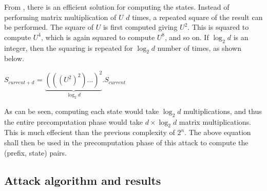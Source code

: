 From \cite{erik-discussions}, there is an efficient solution for computing the states. Instead of performing matrix multiplication of $U$ $d$ times, a repeated square of the result can be performed. The square of $U$ is first computed giving $U^2$. This is squared to compute $U^4$, which is again squared to compute $U^8$, and so on. If $\log_2{d}$ is an integer, then the squaring is repeated for $\log_2{d}$ number of times, as shown below.

\begin{center}
\large{$S_{current + d}$ = $\underbrace{(((U^2)^2) \dotsc )^2}_{\log_2{d}} . S_{current}$}\\
\end{center}
\label{eq:state-trans}

As can be seen, computing each state would take $\log_2{d}$ multiplications, and thus the entire precomputation phase would take $d \times \log_2{d}$ matrix multiplications. This is much effecient than the previous complexity of $2^n$. The above equation shall then be used in the precomputation phase of this attack to compute the (prefix, state) pairs.


\subsection{Attack algorithm and results}

